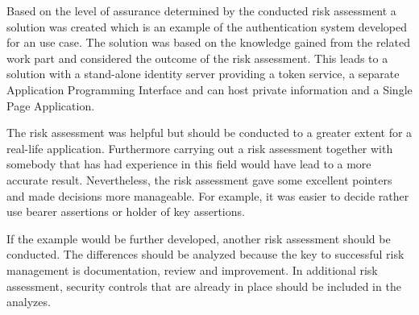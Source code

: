 Based on the level of assurance determined by the conducted risk assessment a solution was created which is an example of the authentication system developed for an use case. The solution was based on the knowledge gained from the related work part and considered the outcome of the risk assessment. This leads to a solution with a stand-alone identity server providing a token service, a separate Application Programming Interface and can host private information and a Single Page Application. 

The risk assessment was helpful but should be conducted to a greater extent for a real-life application. Furthermore carrying out a risk assessment together with somebody that has had experience in this field would have lead to a more accurate result. Nevertheless, the risk assessment gave some excellent pointers and made decisions more manageable. For example, it was easier to decide rather use bearer assertions or holder of key assertions. 

If the example would be further developed, another risk assessment should be conducted. The differences should be analyzed because the key to successful risk management is documentation, review and improvement. In additional risk assessment, security controls that are already in place should be included in the analyzes.


\chapterend

